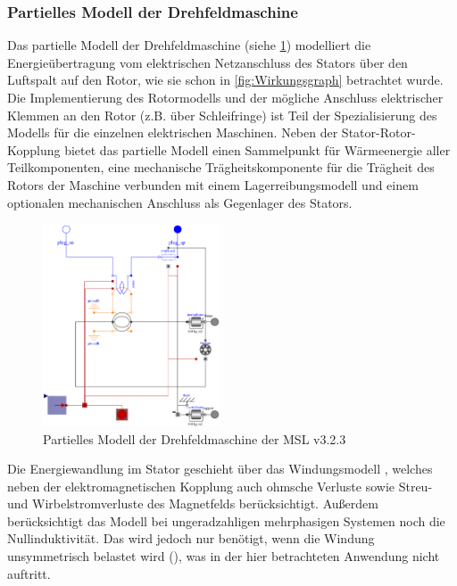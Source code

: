 \subsubsection{Partielles Modell der Drehfeldmaschine}\label{sec:partielles-modell-der-drehfeldmaschine}
Das partielle Modell der Drehfeldmaschine (siehe \cref{fig:partiellDrehfeldmaschinen}) modelliert die Energieübertragung vom elektrischen Netzanschluss des Stators über den Luftspalt auf den Rotor, wie sie schon in \cref{fig:Wirkungsgraph} betrachtet wurde. Die Implementierung des Rotormodells und der mögliche Anschluss elektrischer Klemmen an den Rotor (z.B. über Schleifringe) ist Teil der Spezialisierung des Modells für die einzelnen elektrischen Maschinen. Neben der Stator-Rotor-Kopplung bietet das partielle Modell einen Sammelpunkt für Wärmeenergie aller Teilkomponenten, eine mechanische Trägheitskomponente für die Trägheit des Rotors der Maschine verbunden mit einem Lagerreibungsmodell und einem optionalen mechanischen Anschluss als Gegenlager des Stators.

\begin{figure}
\centering
\includegraphics[height=6cm]{Bilder/PartialBasicInductionMachine.pdf}
\caption{Partielles Modell der Drehfeldmaschine  der MSL v3.2.3}
\label{fig:partiellDrehfeldmaschinen}
\end{figure}

Die Energiewandlung im Stator geschieht über das Windungsmodell , welches neben der elektro\-mag\-ne\-ti\-schen Kopplung auch ohmsche Verluste sowie Streu- und Wirbelstromverluste des Magnetfelds berücksichtigt. Außerdem berücksichtigt das Modell  bei ungeradzahligen mehrphasigen Systemen noch die Nullinduktivität. Das wird jedoch nur benötigt, wenn die Windung unsymmetrisch belastet wird (\cite[S. 193]{kralModelicaObjektorientierteModellbildung2019}), was in der hier betrachteten Anwendung nicht auftritt.

